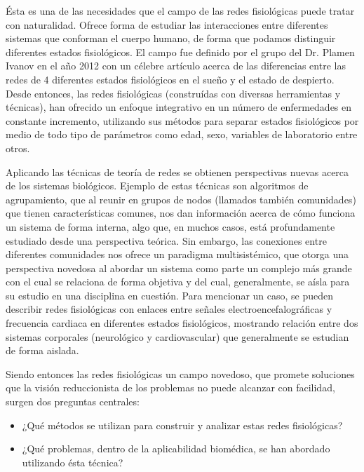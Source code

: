 \documentclass[twoside,twocolumn]{article}
\begin{document}
Ésta es una de las necesidades que el campo de las redes fisiológicas puede tratar con naturalidad.
Ofrece forma de estudiar las interacciones entre diferentes sistemas que conforman el cuerpo humano, de forma que podamos distinguir diferentes estados fisiológicos.
El campo fue definido por el grupo del Dr. Plamen Ivanov en el año 2012 con un célebre artículo acerca de las diferencias entre las redes de 4 diferentes estados fisiológicos en el sueño y el estado de despierto\cite{bashan2012network}.
Desde entonces, las redes fisiológicas (construídas con diversas herramientas y técnicas), han ofrecido un enfoque integrativo en un número de enfermedades en constante incremento, utilizando sus métodos para separar estados fisiológicos por medio de todo tipo de parámetros como edad, sexo, variables de laboratorio entre otros\cite{ivanov2016focus}.

Aplicando las técnicas de teoría de redes se obtienen perspectivas nuevas acerca de los sistemas biológicos.
Ejemplo de estas técnicas son algoritmos de agrupamiento, que al reunir en grupos de nodos (llamados también comunidades) que tienen características comunes, nos dan información acerca de cómo funciona un sistema de forma interna, algo que, en muchos casos, está profundamente estudiado desde una perspectiva teórica.
Sin embargo, las conexiones entre diferentes comunidades nos ofrece un paradigma multisistémico, que otorga una perspectiva novedosa al abordar un sistema como parte un complejo más grande con el cual se relaciona de forma objetiva y del cual, generalmente, se aísla para su estudio en una disciplina en cuestión.
Para mencionar un caso, se pueden describir redes fisiológicas con enlaces entre señales electroencefalográficas y frecuencia cardiaca en diferentes estados fisiológicos, mostrando relación entre dos sistemas corporales (neurológico y cardiovascular) que generalmente se estudian de forma aislada\cite{campos2018hipertension}.

Siendo entonces las redes fisiológicas un campo novedoso, que promete soluciones que la visión reduccionista de los problemas no puede alcanzar con facilidad, surgen dos preguntas centrales:
\begin{itemize}
  \item ¿Qué métodos se utilizan para construir y analizar estas redes fisiológicas?
  \item ¿Qué problemas, dentro de la aplicabilidad biomédica, se han abordado utilizando ésta técnica?
\end{itemize}
\end{document}
